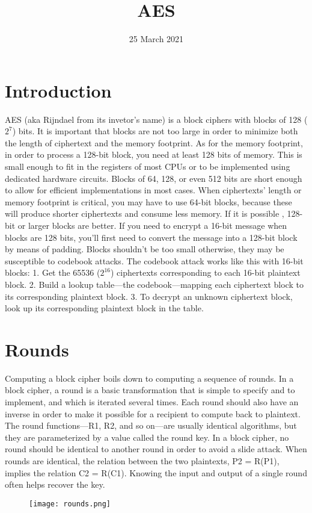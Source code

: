 \documentclass{article}
\title{AES}
\author{}
\date{25 March 2021}
\begin{document}
\maketitle
\section*{Introduction}
AES (aka Rijndael from its invetor's name) is a block ciphers  with blocks of 128 ($2^7$) bits. It is important that blocks are not too large in order to minimize both the length of ciphertext and the memory footprint.
As for the memory footprint, in order to process a 128-bit block, you need at least 128 bits of memory. This is small enough to fit in the registers of most CPUs or to be implemented using dedicated hardware circuits. Blocks of 64, 128, or even 512 bits are short enough to allow for efficient implementations in most cases.
When ciphertexts’ length or memory footprint is critical, you may have to use 64-bit blocks, because these will produce shorter ciphertexts and consume less memory. If it is possible , 128-bit or larger blocks are better. If you need to encrypt a 16-bit message when blocks are 128 bits, you’ll first need to convert the message into a 128-bit block by means of padding. Blocks shouldn’t be too small otherwise, they may be susceptible to codebook attacks. The codebook attack works like this with 16-bit blocks:
1. Get the 65536 ($2^16$) ciphertexts corresponding to each 16-bit
plaintext block.
2. Build a lookup table—the codebook—mapping each ciphertext block
to its corresponding plaintext block.
3. To decrypt an unknown ciphertext block, look up its corresponding
plaintext block in the table.
\section*{Rounds}
Computing a block cipher boils down to computing a sequence of rounds.
In a block cipher, a round is a basic transformation that is simple to specify and to implement, and which is iterated several times. Each round should also have an inverse in order to make it possible for a recipient to compute back to plaintext. The round functions—R1, R2, and so on—are usually identical algorithms, but they are parameterized by a value called the round key.
In a block cipher, no round should be identical to another round in order to avoid a slide attack. When rounds are identical, the relation between the two plaintexts, P2 = R(P1), implies the relation C2 = R(C1). Knowing the input and output of a single round often helps recover the key.
\begin{figure}[htb]
	\begin{center}
  		\texttt{[image: rounds.png]} 
 	\end{center}
\end{figure}
\end{document}

